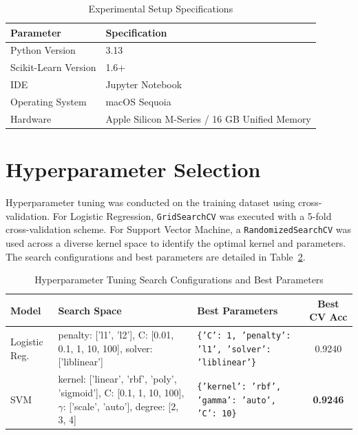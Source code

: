 \documentclass[12pt,a4paper]{article}
\begin{document}
\begin{table}[H]
\centering
\caption{Experimental Setup Specifications}
\label{tab:exp_setup}
\vspace{0.2cm}
\begin{tabular}{ll}
\toprule
\textbf{Parameter} & \textbf{Specification} \\
\midrule
Python Version & 3.13 \\
Scikit-Learn Version & 1.6+ \\
IDE & Jupyter Notebook \\
Operating System & macOS Sequoia \\
Hardware & Apple Silicon M-Series / 16 GB Unified Memory \\
\bottomrule
\end{tabular}
\end{table}

\section{Hyperparameter Selection}
Hyperparameter tuning was conducted on the training dataset using cross-validation. For Logistic Regression, \texttt{GridSearchCV} was executed with a 5-fold cross-validation scheme. For Support Vector Machine, a \texttt{RandomizedSearchCV} was used across a diverse kernel space to identify the optimal kernel and parameters. The search configurations and best parameters are detailed in Table~\ref{tab:tuning_summary}.

\begin{table}[H]
\centering
\caption{Hyperparameter Tuning Search Configurations and Best Parameters}
\label{tab:tuning_summary}
\vspace{0.2cm}
\begin{tabular}{lp{5.5cm}lc}
\toprule
\textbf{Model} & \textbf{Search Space} & \textbf{Best Parameters} & \textbf{Best CV Acc} \\
\midrule
Logistic Reg. & penalty: ['l1', 'l2'], C: [0.01, 0.1, 1, 10, 100], solver: ['liblinear'] & \texttt{\{'C': 1, 'penalty': 'l1', 'solver': 'liblinear'\}} & 0.9240 \\
\midrule
SVM & kernel: ['linear', 'rbf', 'poly', 'sigmoid'], C: [0.1, 1, 10, 100], $\gamma$: ['scale', 'auto'], degree: [2, 3, 4] & \texttt{\{'kernel': 'rbf', 'gamma': 'auto', 'C': 10\}} & \textbf{0.9246} \\
\bottomrule
\end{tabular}
\end{table}
\end{document}
